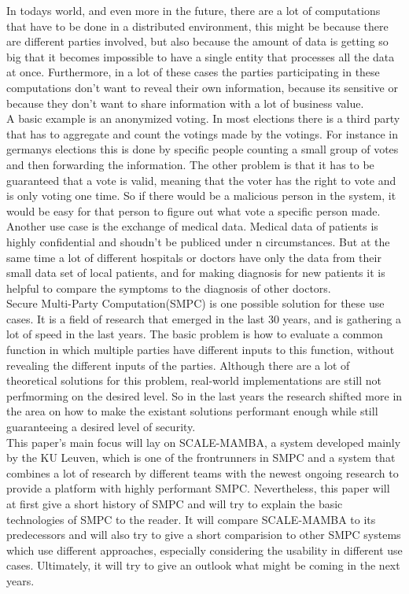 \documentclass[english,runningheads,a4paper]{llncs}[2018/03/10]
\begin{document}
In todays world, and even more in the future, there are a lot of computations that have to be done in a distributed environment, this might be because there are different parties involved, but also because the amount of data is getting so big that it becomes impossible to have a single entity that processes all the data at once. Furthermore, in a lot of these cases the parties participating in these computations don't want to reveal their own information, because its sensitive or because they don't want to share information with a lot of business value.\\
A basic example is an anonymized voting. In most elections there is a third party that has to aggregate and count the votings made by the votings. For instance in germanys elections this is done by specific people counting a small group of votes and then forwarding the information. The other problem is that it has to be guaranteed that a vote is valid, meaning that the voter has the right to vote and is only voting one time. So if there would be a malicious person in the system, it would be easy for that person to figure out what vote a specific person made.\\
Another use case is the exchange of medical data. Medical data of patients is highly confidential and shoudn't be publiced under n circumstances. But at the same time a lot of different hospitals or doctors have only the data from their small data set of local patients, and for making diagnosis for new patients it is helpful to compare the symptoms to the diagnosis of other doctors.\\
Secure Multi-Party Computation(SMPC) is one possible solution for these use cases. It is a field of research that emerged in the last 30 years, and is gathering a lot of speed in the last years. 
The basic problem is how to evaluate a common function in which multiple parties have different inputs to this function, without revealing the different inputs of the parties. Although there are a lot of theoretical solutions for this problem, real-world implementations are still not perfmorming on the desired level. So in the last years the research shifted more in the area on how to make the existant solutions performant enough while still guaranteeing a desired level of security.\\
This paper's main focus will lay on SCALE-MAMBA, a system developed mainly by the KU Leuven, which is one of the frontrunners in SMPC and a system that combines a lot of research by different teams with the newest ongoing research to provide a platform with highly performant SMPC. Nevertheless, this paper will at first give a short history of SMPC and will try to explain the basic technologies of SMPC to the reader. It will compare SCALE-MAMBA to its predecessors and will also try to give a short comparision to other SMPC systems which use different approaches, especially considering the usability in different use cases. Ultimately, it will try to give an outlook what might be coming in the next years.\\
\end{document}
